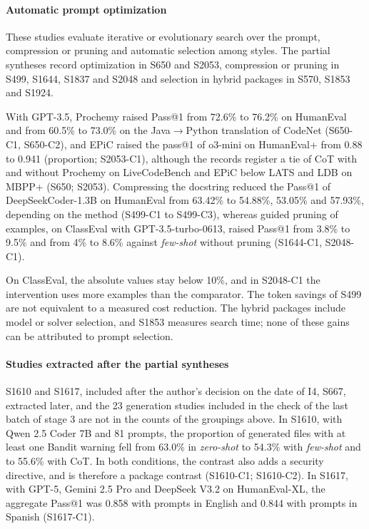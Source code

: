\paragraph{Automatic prompt optimization}
These studies evaluate iterative or evolutionary search over the prompt, compression or pruning and automatic selection among styles. The partial syntheses record optimization in S650 and S2053, compression or pruning in S499, S1644, S1837 and S2048 and selection in hybrid packages in S570, S1853 and S1924.

With GPT-3.5, Prochemy raised Pass@1 from 72.6\% to 76.2\% on HumanEval and from 60.5\% to 73.0\% on the Java$\rightarrow$Python translation of CodeNet (S650-C1, S650-C2), and EPiC raised the pass@1 of o3-mini on HumanEval+ from 0.88 to 0.941 (proportion; S2053-C1), although the records register a tie of CoT with and without Prochemy on LiveCodeBench and EPiC below LATS and LDB on MBPP+ (S650; S2053).
Compressing the docstring reduced the Pass@1 of DeepSeekCoder-1.3B on HumanEval from 63.42\% to 54.88\%, 53.05\% and 57.93\%, depending on the method (S499-C1 to S499-C3), whereas guided pruning of examples, on ClassEval with GPT-3.5-turbo-0613, raised Pass@1 from 3.8\% to 9.5\% and from 4\% to 8.6\% against \textit{few-shot} without pruning (S1644-C1, S2048-C1).

On ClassEval, the absolute values stay below 10\%, and in S2048-C1 the intervention uses more examples than the comparator. The token savings of S499 are not equivalent to a measured cost reduction. The hybrid packages include model or solver selection, and S1853 measures search time; none of these gains can be attributed to prompt selection.

\paragraph{Studies extracted after the partial syntheses}
S1610 and S1617, included after the author's decision on the date of I4, S667, extracted later, and the 23 generation
studies included in the check of the last batch of stage 3 are not in the counts of the groupings above.
In S1610, with Qwen 2.5 Coder 7B and 81 prompts, the proportion of generated files with at least one Bandit warning fell
from 63.0\% in \textit{zero-shot} to 54.3\% with \textit{few-shot} and to 55.6\% with CoT. In both conditions, the contrast also
adds a security directive, and is therefore a package contrast (S1610-C1; S1610-C2).
In S1617, with GPT-5, Gemini 2.5 Pro and DeepSeek V3.2 on HumanEval-XL, the aggregate Pass@1 was 0.858 with prompts in English and 0.844 with prompts in Spanish (S1617-C1).

